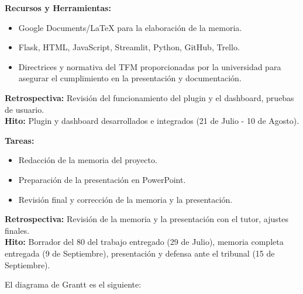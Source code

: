 \begin{tcolorbox}[phasebox, title=Fases del trabajo]
\begin{tcolorbox}[sprintbox, title= Sprint 7 y 8: Desarrollo del Plugin y el Dashboard]
        \textbf{Recursos y Herramientas:}
        \begin{itemize}
            \item Google Documents/LaTeX para la elaboración de la memoria.
            \item Flask, HTML, JavaScript, Streamlit, Python, GitHub, Trello.
            \item Directrices y normativa del TFM proporcionadas por la universidad para asegurar el cumplimiento en la presentación y documentación.

        \end{itemize}
        \textbf{Retrospectiva:} Revisión del funcionamiento del plugin y el dashboard, pruebas de usuario.\\
        \textbf{Hito:} Plugin y dashboard desarrollados e integrados (21 de Julio - 10 de Agosto).


    \end{tcolorbox}
    
    \begin{tcolorbox}[sprintbox, title= Sprint 9:  Redacción de la Memoria y Preparación de la Presentación]
        \textbf{Tareas:}
        \begin{itemize}
            \item Redacción de la memoria del proyecto.

            \item Preparación de la presentación en PowerPoint.

            \item Revisión final y corrección de la memoria y la presentación.

            
        \end{itemize}
       
        \textbf{Retrospectiva:}  Revisión de la memoria y la presentación con el tutor, ajustes finales.\\
        \textbf{Hito:} Borrador del 80 del trabajo entregado (29 de Julio), memoria completa entregada (9 de Septiembre), presentación y defensa ante el tribunal (15 de Septiembre).

    \end{tcolorbox}

\end{tcolorbox}
\medskip

El diagrama de Grantt es el siguiente:
\bigskip        

